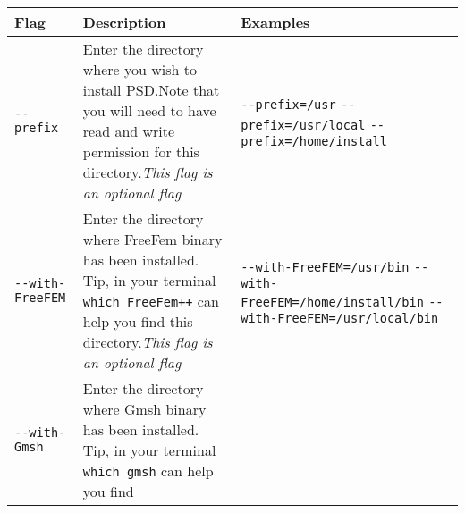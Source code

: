 \begin{longtable}[]{@{}lll@{}}
\toprule
\begin{minipage}[b]{0.14\columnwidth}\raggedright\strut
\textbf{Flag}\strut
\end{minipage} & \begin{minipage}[b]{0.39\columnwidth}\raggedright\strut
\textbf{Description}\strut
\end{minipage} & \begin{minipage}[b]{0.39\columnwidth}\raggedright\strut
\textbf{Examples}\strut
\end{minipage}\tabularnewline
\midrule
\endhead
\begin{minipage}[t]{0.14\columnwidth}\raggedright\strut
\lstinline!--prefix!\strut
\end{minipage} & \begin{minipage}[t]{0.39\columnwidth}\raggedright\strut
Enter the directory where you wish to install PSD.Note that you will
need to have read and write permission for this directory.\emph{This
flag is an optional flag}\strut
\end{minipage} & \begin{minipage}[t]{0.39\columnwidth}\raggedright\strut
\lstinline!--prefix=/usr! \lstinline!--prefix=/usr/local!
\lstinline!--prefix=/home/install!\strut
\end{minipage}\tabularnewline
\begin{minipage}[t]{0.14\columnwidth}\raggedright\strut
\lstinline!--with-FreeFEM!\strut
\end{minipage} & \begin{minipage}[t]{0.39\columnwidth}\raggedright\strut
Enter the directory where FreeFem binary has been installed. Tip, in
your terminal \lstinline!which FreeFem++! can help you find this
directory.\emph{This flag is an optional flag}\strut
\end{minipage} & \begin{minipage}[t]{0.39\columnwidth}\raggedright\strut
\lstinline!--with-FreeFEM=/usr/bin!
\lstinline!--with-FreeFEM=/home/install/bin!
\lstinline!--with-FreeFEM=/usr/local/bin!\strut
\end{minipage}\tabularnewline
\begin{minipage}[t]{0.14\columnwidth}\raggedright\strut
\lstinline!--with-Gmsh!\strut
\end{minipage} & \begin{minipage}[t]{0.39\columnwidth}\raggedright\strut
Enter the directory where Gmsh binary has been installed. Tip, in your
terminal \lstinline!which gmsh! can help you find

\end{minipage}
\end{longtable}
